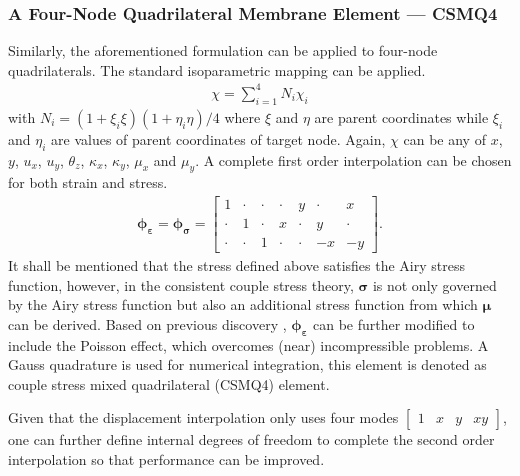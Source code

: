 \documentclass[3p,sort&compress,11pt,fleqn]{elsarticle}
\begin{document}
\subsubsection{A Four-Node Quadrilateral Membrane Element --- CSMQ4}
Similarly, the aforementioned formulation can be applied to four-node quadrilaterals. The standard isoparametric mapping can be applied.
\begin{gather}
\chi=\sum_{i=1}^4N_i\chi_i
\end{gather}
with $N_i=\left(1+\xi_i\xi\right)\left(1+\eta_i\eta\right)/4$ where $\xi$ and $\eta$ are parent coordinates while $\xi_i$ and $\eta_i$ are values of parent coordinates of target node. Again, $\chi$ can be any of $x$, $y$, $u_x$, $u_y$, $\theta_z$, $\kappa_x$, $\kappa_y$, $\mu_x$ and $\mu_y$. A complete first order interpolation can be chosen for both strain and stress.
\begin{gather}
\mathbold{\phi}_\mathbold{\varepsilon}=\mathbold{\phi}_\mathbold{\sigma}=\begin{bmatrix}
1&\cdot&\cdot&\cdot&y&\cdot&x\\\cdot&1&\cdot&x&\cdot&y&\cdot\\\cdot&\cdot&1&\cdot&\cdot&-x&-y
\end{bmatrix}.
\end{gather}
It shall be mentioned that the stress defined above satisfies the Airy stress function, however, in the consistent couple stress theory, $\mathbold{\sigma}$ is not only governed by the Airy stress function but also an additional stress function \citep{Hadjesfandiari2011} from which $\mathbold{\mu}$ can be derived. Based on previous discovery \citep{Chang2019}, $\mathbold{\phi}_\mathbold{\varepsilon}$ can be further modified to include the Poisson effect, which overcomes (near) incompressible problems. A  Gauss quadrature is used for numerical integration, this element is denoted as couple stress mixed quadrilateral (CSMQ4) element.

Given that the displacement interpolation only uses four modes $\begin{bmatrix}
1&x&y&xy
\end{bmatrix}$, one can further define internal degrees of freedom to complete the second order interpolation so that performance can be improved.
\end{document}
